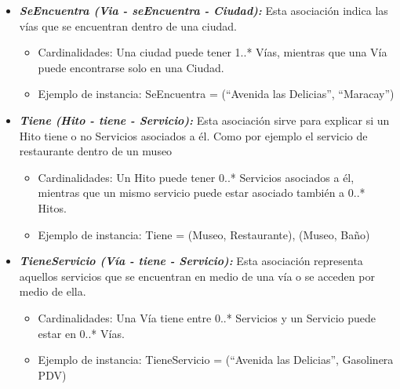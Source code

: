 \documentclass[a4paper]{article}
\begin{document}
\begin{itemize}
{}



\item{

	\textbf{\textit{SeEncuentra (Via - seEncuentra - Ciudad):}}
  		Esta asociación indica las vías que se encuentran dentro de una ciudad.
        
        
 \begin{itemize}
        
  \item Cardinalidades: Una ciudad puede tener 1..* Vías, mientras que una Vía puede encontrarse solo en una Ciudad.
  \item Ejemplo de instancia: SeEncuentra = {(“Avenida las Delicias”, “Maracay”)}
   \end{itemize}


}




\item{

	\textbf{\textit{Tiene (Hito - tiene - Servicio): }}Esta asociación sirve para explicar si un Hito tiene o no Servicios asociados a él. Como por ejemplo el servicio de restaurante dentro de un museo
  		
        
        
 \begin{itemize}
        
  \item Cardinalidades: Un Hito puede tener 0..* Servicios asociados a él, mientras que un mismo servicio puede estar asociado también a 0..* Hitos.
\item Ejemplo de instancia: Tiene = {(Museo, Restaurante), (Museo, Baño)}
   \end{itemize}


}





\item{

	\textbf{\textit{TieneServicio (Vía - tiene - Servicio): }}Esta asociación representa aquellos servicios que se encuentran en medio de una vía o se acceden por medio de ella.
  		
        
        
 \begin{itemize}
        
  \item Cardinalidades: Una Vía tiene entre 0..* Servicios y un Servicio puede estar en 0..* Vías.
 \item Ejemplo de instancia: TieneServicio = {(“Avenida las Delicias”, Gasolinera PDV)}
   \end{itemize}


}
\end{itemize}
\end{document}
